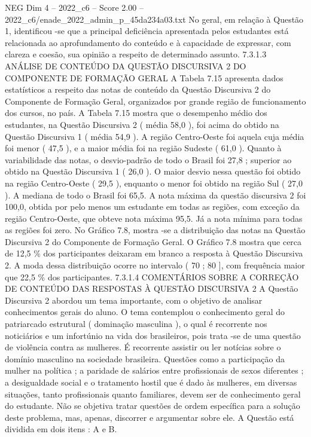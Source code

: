 \begin{textsample}{NEG Dim 4 – 2022\_c6 – Score 2.00 – 2022\_c6/enade\_2022\_admin\_p\_45da234a03.txt}
No geral, em relação à Questão 1, identificou -se que a principal deficiência apresentada pelos estudantes está relacionada ao aprofundamento do conteúdo e à capacidade de expressar, com clareza e coesão, sua opinião a respeito de determinado assunto. 7.3.1.3 ANÁLISE DE CONTEÚDO DA QUESTÃO DISCURSIVA 2 DO COMPONENTE DE FORMAÇÃO GERAL A Tabela 7.15 apresenta dados estatísticos a respeito das notas de conteúdo da Questão Discursiva 2 do Componente de Formação Geral, organizados por grande região de funcionamento dos cursos, no país.
A Tabela 7.15 mostra que o desempenho médio dos estudantes, na Questão Discursiva 2 ( média 58,0 ), foi acima do obtido na Questão Discursiva 1 ( média 54,9 ).
A região Centro-Oeste foi aquela cuja média foi menor ( 47,5 ), e a maior média foi na região Sudeste ( 61,0 ).
Quanto à variabilidade das notas, o desvio-padrão de todo o Brasil foi 27,8 ; superior ao obtido na Questão Discursiva 1 ( 26,0 ).
O maior desvio nessa questão foi obtido na região Centro-Oeste ( 29,5 ), enquanto o menor foi obtido na região Sul ( 27,0 ).
A mediana de todo o Brasil foi 65,5.
A nota máxima da questão discursiva 2 foi 100,0, obtida por pelo menos um estudante em todas as regiões, com exceção da região Centro-Oeste, que obteve nota máxima 95,5.
Já a nota mínima para todas as regiões foi zero.
No Gráfico 7.8, mostra -se a distribuição das notas na Questão Discursiva 2 do Componente de Formação Geral.
O Gráfico 7.8 mostra que cerca de 12,5 \% dos participantes deixaram em branco a resposta à Questão Discursiva 2.
A moda dessa distribuição ocorre no intervalo ( 70 ; 80 ], com frequência maior que 22,5 \% dos participantes. 7.3.1.4 COMENTÁRIOS SOBRE A CORREÇÃO DE CONTEÚDO DAS RESPOSTAS À QUESTÃO DISCURSIVA 2 A Questão Discursiva 2 abordou um tema importante, com o objetivo de analisar conhecimentos gerais do aluno.
O tema contemplou o conhecimento geral do patriarcado estrutural ( dominação masculina ), o qual é recorrente nos noticiários e um infortúnio na vida dos brasileiros, pois trata -se de uma questão de violência contra as mulheres.
É recorrente assistir ou ler notícias sobre o domínio masculino na sociedade brasileira.
Questões como a participação da mulher na política ; a paridade de salários entre profissionais de sexos diferentes ; a desigualdade social e o tratamento hostil que é dado às mulheres, em diversas situações, tanto profissionais quanto familiares, devem ser de conhecimento geral do estudante.
Não se objetiva tratar questões de ordem específica para a solução deste problema, mas, apenas, discorrer e argumentar sobre ele.
A Questão está dividida em dois itens : A e B.

\end{textsample}
